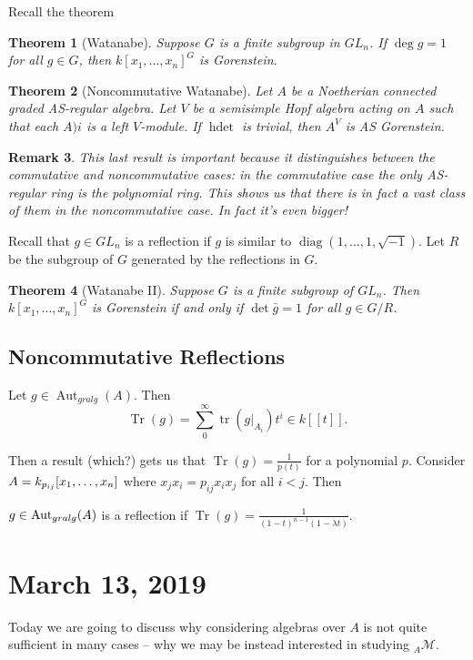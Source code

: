 \documentclass[12pt]{article}
\theoremstyle{break}
\theoremstyle{nonumberbreak}
\theoremstyle{changebreak}
\newtheorem{thm}{Theorem}[subsection]
\theoremstyle{break}
\theoremstyle{nonumberbreak}
\theoremstyle{nonumberplain}
\theoremstyle{change}
\newtheorem{rmk}[thm]{Remark}
\DeclareMathOperator{\Aut}{Aut}
\newcommand*{\calM}{\mathcal{M}}
\let\tilde\relax
\newcommand*{\tilde}[1]{\widetilde{#1}}
\begin{document}
Recall the theorem
\begin{thm}[Watanabe]
	Suppose $G$ is a finite subgroup in $GL_n$. If $\deg g=1$ for all $g\in G$, then $k[x_1,\dots,x_n]^G$ is Gorenstein.
\end{thm}
\begin{thm}[Noncommutative Watanabe]
	Let $A$ be a Noetherian connected graded AS-regular algebra. Let $V$ be a semisimple Hopf algebra acting on 
	$A$ such that each $A)i$ is a left $V$-module. If $\operatorname{hdet}$ is trivial, then $A^V$ is AS Gorenstein.
\end{thm}
\begin{rmk}
	This last result is important because it distinguishes between the commutative and noncommutative cases: in the commutative
	case the only AS-regular ring is the polynomial ring. This shows us that there is in fact a vast class of them 
	in the noncommutative case. In fact it's even bigger!
\end{rmk}
Recall that $g\in GL_n$ is a reflection if $g$ is similar to $\operatorname{diag}(1,\dots,1,\sqrt{-1})$. Let $R$ be the subgroup of $G$ generated
by the reflections in $G$. 
\begin{thm}[Watanabe II]
	Suppose $G$ is a finite subgroup of $GL_n$. Then $k[x_1,\dots,x_n]^G$ is Gorenstein if and only if
	$\det \bar g=1$ for all $g\in G/R$.
\end{thm}

\subsection{Noncommutative Reflections}
\begin{defn}
	Let $g\in\Aut_{gralg}(A)$. Then
	\[\operatorname{Tr}(g)=\sum_0^\infty \operatorname{tr}(g|_{A_i})t^i\in k[[t]].\]
\end{defn}
Then a result (which?) gets us that $\operatorname{Tr}(g)=\frac{1}{p(t)}$ for a polynomial $p$.
Consider $\tilde A=k_{p_{ij}}[x_1,\dots,x_n]$ where $x_jx_i=p_{ij}x_ix_j$ for all $i<j$. Then 
\begin{defn}
	$g\in\Aut_{gralg}(\tilde A)$ is a reflection if $\operatorname{Tr}(g)=\frac{1}{(1-t)^{n-1}(1-\lambda t)}$.
\end{defn}

\section{March 13, 2019}
Today we are going to discuss why considering algebras over $A$ is not quite sufficient in many cases --
why we may be instead interested in studying $_A\calM$.
\end{document}
